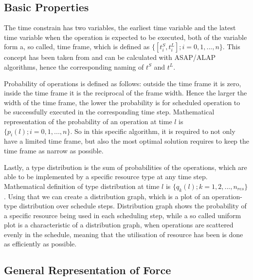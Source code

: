 \documentclass[conference]{IEEEtran}
\begin{document}
\subsection{Basic Properties}

The time constrain has two variables, the earliest time variable and the latest time variable when the operation is expected to be executed, both of the variable form a, so called, time frame, which is defined as $\{[t_i^S, t_i^L]; i = 0, 1, ..., n\}$. This concept has been taken from and can be calculated with ASAP/ALAP algorithms, hence the corresponding naming of $t^S$ and $t^L$.

Probability of operations is defined as follows: outside the time frame it is zero, inside the time frame it is the reciprocal of the frame width. Hence the larger the width of the time frame, the lower the probability is for scheduled operation to be successfully executed in the corresponding time step. Mathematical representation of the probability of an operation at time $l$ is $\{p_i (l); i = 0, 1, ..., n\}$. So in this specific algorithm, it is required to not only have a limited time frame, but also the most optimal solution requires to keep the time frame as narrow as possible.

Lastly, a type distribution is the sum of probabilities of the operations, which are able to be implemented by a specific resource type at any time step. Mathematical definition of type distribution at time $l$ is $\{q_k (l); k = 1, 2, ..., n_{res}\}$. Using that we can create a distribution graph, which is a plot of an operation-type distribution over schedule steps. Distribution graph shows the probability of a specific resource being used in each scheduling step, while a so called uniform plot is a characteristic of a distribution graph, when operations are scattered evenly in the schedule, meaning that the utilisation of resource has been is done as efficiently as possible.

\subsection{General Representation of Force}
\end{document}
